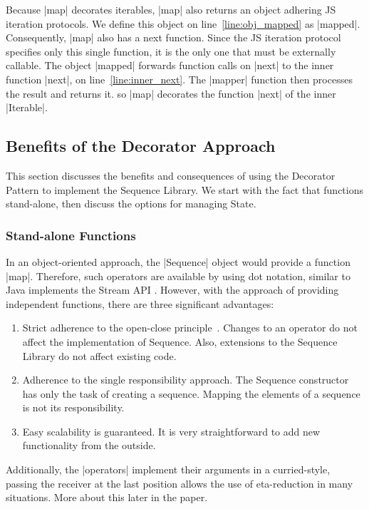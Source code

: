 Because |map| decorates iterables, |map| also returns an object adhering JS
iteration protocols. 
We define this object on line~\ref{line:obj_mapped} as |mapped|. 
Consequently, |map| also has a next function. Since the JS iteration protocol 
specifies only this single function, it is the only one that must be externally 
callable. The object |mapped| forwards function calls on |next| to the
inner function |next|, on line~\ref{line:inner_next}. The |mapper| function then 
processes the result and returns it. so |map| decorates the function |next| of
the inner |Iterable|.

\subsection{Benefits of the Decorator Approach}
\label{sub:Benefits of the Decorator Approach}
This section discusses the benefits and consequences of using the Decorator 
Pattern to implement the Sequence Library. We start with the fact that functions 
stand-alone, then discuss the options for managing State.

\subsubsection{Stand-alone Functions}
\label{subsub:Standalone Functions}
In an object-oriented approach, the |Sequence| object would provide a function
|map|. Therefore, such operators are available by using dot notation,
similar to Java implements the Stream API \cite{java_stream}. 
However, with the approach of providing independent functions, there 
are three significant advantages:

\begin{enumerate}
  \item {Strict adherence to the open-close principle~\cite[p.~3]{eilebrecht_patterns_2019}. Changes to an operator do
      not affect the implementation of Sequence. Also, extensions to the 
      Sequence Library do not affect existing code.
    }
  \item{Adherence to the single responsibility approach. The Sequence 
      constructor has only the task of creating a sequence. Mapping the
    elements of a sequence is not its responsibility.
  }
  \item{Easy scalability is guaranteed. It is very straightforward to add new 
    functionality from the outside.
  }
\end{enumerate}

Additionally, the |operators| implement their arguments in a curried-style, passing the
receiver at the last position allows the use of eta-reduction in many situations. 
More about this later in the paper.

